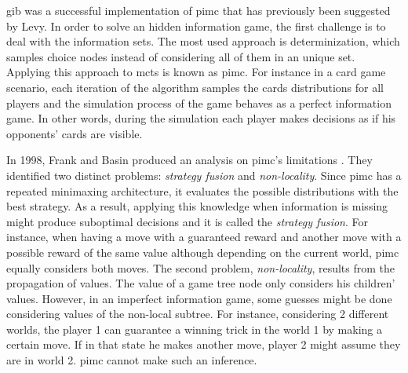 \gls{gib} was a successful implementation of \gls{pimc} that has previously been suggested by Levy. 
In order to solve an hidden information game, the first challenge is to deal with the information sets.
The most used approach is determinization, which samples choice nodes instead of considering all of them in an unique set.
Applying this approach to \gls{mcts} is known as \gls{pimc}.
For instance in a card game scenario, each iteration of the algorithm samples the cards distributions for all players and the simulation process of the game behaves as a perfect information game.
In other words, during the simulation each player makes decisions as if his opponents' cards are visible.


In 1998, Frank and Basin produced an analysis on \gls{pimc}'s limitations \cite{Frank1998}.
They identified two distinct problems: \emph{strategy fusion} and \emph{non-locality}.
Since \gls{pimc} has a repeated minimaxing architecture, it evaluates the possible distributions with the best strategy.
As a result, applying this knowledge when information is missing might produce suboptimal decisions and it is called the \emph{strategy fusion}.
For instance, when having a move with a guaranteed reward and another move with a possible reward of the same value although depending on the current world, \gls{pimc} equally considers both moves.
The second problem, \emph{non-locality}, results from the propagation of values.
The value of a game tree node only considers his children' values.
However, in an imperfect information game, some guesses might be done considering values of the non-local subtree.
For instance, considering 2 different worlds, the player 1 can guarantee a winning trick in the world 1 by making a certain move.
If in that state he makes another move, player 2 might assume they are in world 2.
\gls{pimc} cannot make such an inference.


